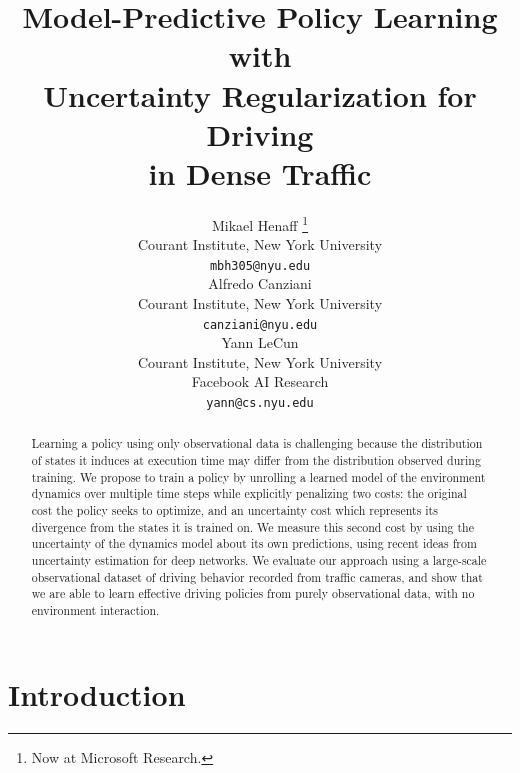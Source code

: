 \documentclass{article} %
\title{
  Model-Predictive Policy Learning with \\
  Uncertainty Regularization for Driving \\
  in Dense Traffic
}
\author{Mikael Henaff \thanks{Now at Microsoft Research.}\\
Courant Institute, New York University\\
\texttt{mbh305@nyu.edu} \\
\And
Alfredo Canziani \\
Courant Institute, New York University\\
\texttt{canziani@nyu.edu} \\
\And
Yann LeCun \\
Courant Institute, New York University\\
Facebook AI Research \\
\texttt{yann@cs.nyu.edu} \\
}
\begin{document}
\newcommand{\modelnamedrop}{MPUR }
\newcommand{\modelnameil}{MPER }

\maketitle

\begin{abstract}
  Learning a policy using only observational data is challenging because the distribution of states it induces at execution time may differ from the distribution observed during training.
  We propose to train a policy by unrolling a learned model of the environment dynamics over multiple time steps while explicitly penalizing two costs: the original cost the policy seeks to optimize, and an uncertainty cost which represents its divergence from the states it is trained on.
We measure this second cost by using the uncertainty of the dynamics model about its own predictions, using recent ideas from uncertainty estimation for deep networks.
  We evaluate our approach using a large-scale observational dataset of driving behavior recorded from traffic cameras, and show that we are able to learn effective driving policies from purely observational data, with no environment interaction.
\end{abstract}


\section{Introduction}
\end{document}
